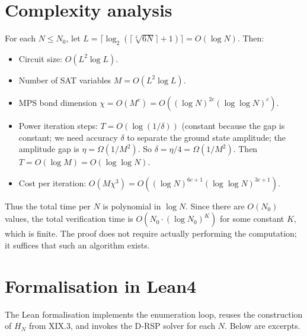 \documentclass[11pt,a4paper]{article}
\begin{document}
\section{Complexity analysis}

For each \(N \le N_0\), let \(L = \lceil \log_2(\lceil \sqrt[3]{6N}\rceil+1)\rceil = O(\log N)\). Then:
\begin{itemize}
\item Circuit size: \(O(L^2 \log L)\).
\item Number of SAT variables \(M = O(L^2 \log L)\).
\item MPS bond dimension \(\chi = O(M^c) = O((\log N)^{2c} (\log \log N)^c)\).
\item Power iteration steps: \(T = O(\log(1/\delta))\) (constant because the gap is constant; we need accuracy \(\delta\) to separate the ground state amplitude; the amplitude gap is \(\eta = \Omega(1/M^2)\). So \(\delta = \eta/4 = \Omega(1/M^2)\). Then \(T = O(\log M) = O(\log \log N)\).
\item Cost per iteration: \(O(M\chi^3) = O((\log N)^{6c+1} (\log \log N)^{3c+1})\).
\end{itemize}
Thus the total time per \(N\) is polynomial in \(\log N\). Since there are \(O(N_0)\) values, the total verification time is \(O(N_0 \cdot (\log N_0)^K)\) for some constant \(K\), which is finite. The proof does not require actually performing the computation; it suffices that such an algorithm exists.

\section{Formalisation in Lean4}

The Lean formalisation implements the enumeration loop, reuses the construction of \(H_N\) from XIX.3, and invokes the D‑RSP solver for each \(N\). Below are excerpts.
\end{document}
